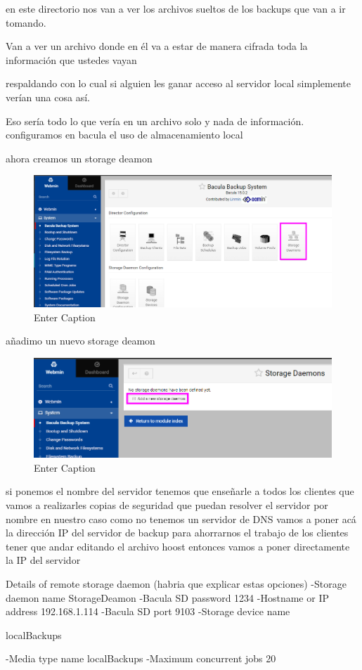 en este directorio nos van a ver los archivos sueltos de los backups que van a ir tomando.

Van a ver un archivo donde en él va a estar de manera cifrada toda la información que ustedes vayan

respaldando con lo cual si alguien les ganar acceso al servidor local simplemente verían una cosa así.

Eso sería todo lo que vería en un archivo solo y nada de información.
configuramos en bacula el uso de almacenamiento local


ahora creamos un storage deamon
\begin{figure}[H]
    \centering
    \includegraphics[width=0.5\linewidth]{instalacionBacula/stdeamon.png}
    \caption{Enter Caption}
\end{figure}


añadimo un nuevo storage deamon
\begin{figure}[H]
    \centering
    \includegraphics[width=0.5\linewidth]{instalacionBacula/newsd.png}
    \caption{Enter Caption}
\end{figure}

si ponemos el nombre del servidor tenemos que enseñarle a todos los clientes que vamos a realizarles copias de seguridad que puedan resolver el servidor por nombre en nuestro caso como no tenemos un servidor de DNS vamos a poner acá la dirección IP del servidor de backup para ahorrarnos el trabajo de los clientes tener que andar editando el archivo hoost entonces vamos a poner directamente la IP del servidor 

Details of remote storage daemon
(habria que explicar estas opciones)
-Storage daemon name
StorageDeamon
-Bacula SD password
1234
-Hostname or IP address
192.168.1.114
-Bacula SD port
9103
-Storage device name

localBackups
 

-Media type name
localBackups
-Maximum concurrent jobs
20


